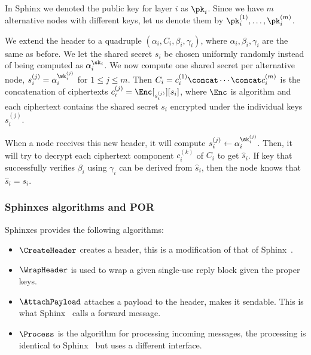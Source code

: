 In Sphinx we denoted the public key for layer \(i\) as \(\pk_i\).
Since we have \(m\) alternative nodes with different keys, let us denote them 
by \(\pk_i^{(1)}, \dotsc, \pk_i^{(m)}\).

We extend the header to a quadruple \((\alpha_i, C_i, \beta_i, \gamma_i)\), 
where \(\alpha_i, \beta_i, \gamma_i\) are the same as before.
We let the shared secret \(s_i\) be chosen uniformly randomly instead of being 
computed as \(\alpha_i^{\sk_i}\).
We now compute one shared secret per alternative node, \ie \(s_i^{(j)} = 
  \alpha_i^{\sk_i^{(j)}}\) for \(1\leq j\leq m\).
Then \(C_i = c_i^{(1)}\concat \dotsb\concat c_i^{(m)}\) is the concatenation of 
ciphertexts \(c_i^{(j)} = \Enc[_{s_i^{(j)}}][s_i]\), where \(\Enc\) is 
 algorithm and each ciphertext contains the shared secret \(s_i\) 
encrypted under the individual keys \(s_i^{(j)}\). 

When a node receives this new header, it will compute \(s_i^{(j)}\gets 
  \alpha_i^{\sk_i^{(j)}}\).
Then, it will try to decrypt each ciphertext component \(c_i^{(k)}\) of \(C_i\) 
to get \(\hat s_i\).
If  key that successfully verifies \(\beta_i\) using \(\gamma_i\) can 
be derived from \(\hat s_i\), then the node knows that \(\hat s_i = s_i\).


\subsubsection{Sphinxes algorithms and \acf*{POR}}

\NewAlgorithm{\CreateHeader}{\Sphinxes[CreateHeader]}
\NewAlgorithm{\WrapHeader}{\Sphinxes[WrapHeader]}
\NewAlgorithm{\AttachPayload}{\Sphinxes[AttachPayload]}
\NewAlgorithm{\Process}{\Sphinxes[Process]}

Sphinxes provides the following algorithms:
\begin{itemize}
  \item \(\CreateHeader\) creates a header, this is a modification of that of 
    Sphinx~\cite[\S 3.2, \S 3.4]{Sphinx}.
  \item \(\WrapHeader\) is used to wrap a given single-use reply block given 
    the proper keys.
  \item \(\AttachPayload\) attaches a payload to the header, \ie makes it 
    sendable.
    This is what Sphinx~\cite[\S 3.3]{Sphinx} calls a forward message.
  \item \(\Process\) is the algorithm for processing incoming messages, the 
    processing is identical to Sphinx~\cite[\S 3.6, \S 3.7]{Sphinx} but uses a 
    different interface.
\end{itemize}

